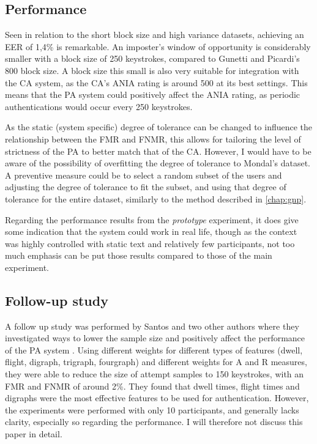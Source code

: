 \documentclass[informationsecurity]{gucmasterproject}
\begin{document}
\subsection{Performance}
Seen in relation to the short block size and high variance datasets, achieving an EER of 1,4\% is remarkable.
An imposter's window of opportunity is considerably smaller with a block size of 250 keystrokes, compared to Gunetti and Picardi's 800 block size.
A block size this small is also very suitable for integration with the CA system, as the CA's ANIA rating is around 500 \cite{mondal} at its best settings.
This means that the PA system could positively affect the ANIA rating, as periodic authentications would occur every 250 keystrokes.

As the static (system specific) degree of tolerance can be changed to influence the relationship between the FMR and FNMR, this allows for tailoring the level of strictness of the PA to better match that of the CA.
However, I would have to be aware of the possibility of overfitting the degree of tolerance to Mondal's dataset.
A preventive measure could be to select a random subset of the users and adjusting the degree of tolerance to fit the subset, and using that degree of tolerance for the entire dataset, similarly to the method described in \cref{chap:gnp}.

Regarding the performance results from the \textit{prototype} experiment, it does give some indication that the system could work in real life, though as the context was highly controlled with static text and relatively few participants, not too much emphasis can be put those results compared to those of the main experiment.




\subsection{Follow-up study}
A follow up study was performed by Santos and two other authors where they investigated ways to lower the sample size and positively affect the performance of the PA system \cite{Pinto2014}.
Using different weights for different types of features (dwell, flight, digraph, trigraph, fourgraph) and different weights for A and R measures, they were able to reduce the size of attempt samples to 150 keystrokes, with an FMR and FNMR of around 2\%.
They found that dwell times, flight times and digraphs were the most effective features to be used for authentication.
However, the experiments were performed with only 10 participants, and generally lacks clarity, especially so regarding the performance.
I will therefore not discuss this paper in detail.
\end{document}
